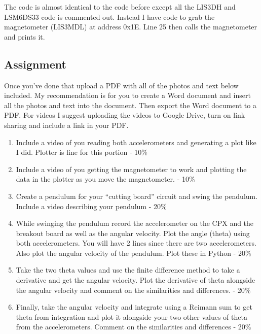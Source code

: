 The code is almost identical to the code before except all the LIS3DH and LSM6DS33 code is commented out. Instead I have code to grab the magnetometer (LIS3MDL) at address 0x1E. Line 25 then calls the magnetometer and prints it. 

\subsection{Assignment}

Once you've done that upload a PDF with all of the photos and text below included. My recommendation is for you to create a Word document and insert all the photos and text into the document. Then export the Word document to a PDF. For videos I suggest uploading the videos to Google Drive, turn on link sharing and include a link in your PDF.

\begin{enumerate}[itemsep=-5pt]
\item Include a video of you reading both accelerometers and generating a plot like I did. Plotter is fine for this portion - 10\%
\item Include a video of you getting the magnetometer to work and plotting the data in the plotter as you move the magnetometer. - 10\%
\item Create a pendulum for your “cutting board” circuit and swing the pendulum. Include a video describing your pendulum - 20\%
\item While swinging the pendulum record the accelerometer on the CPX and the breakout board as well as the angular velocity. Plot the angle (theta) using both accelerometers. You will have 2 lines since there are two accelerometers. Also plot the angular velocity of the pendulum. Plot these in Python - 20\%
\item Take the two theta values and use the finite difference method to take a derivative and get the angular velocity. Plot the derivative of theta alongside the angular velocity and comment on the similarities and differences. - 20\%
\item Finally, take the angular velocity and integrate using a Reimann sum to get theta from integration and plot it alongside your two other values of theta from the accelerometers. Comment on the similarities and differences - 20\%
\end{enumerate}